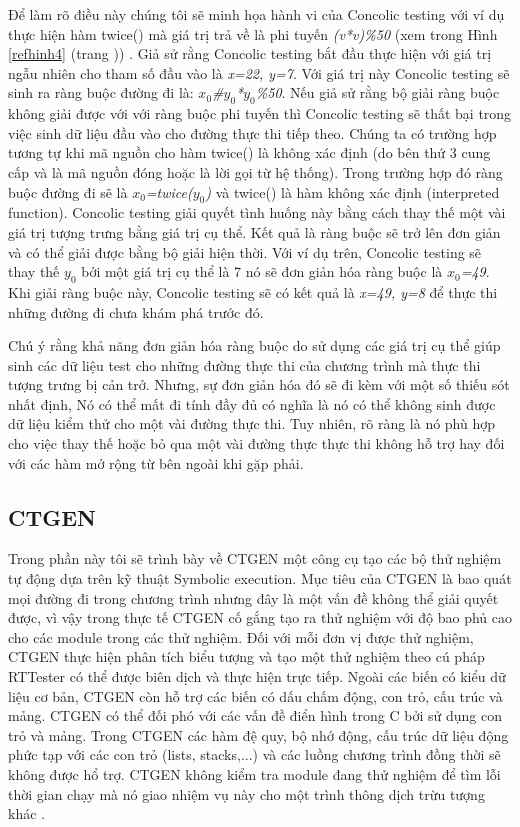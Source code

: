 \documentclass[12pt,a4paper]{article}
\begin{document}
\begin{enumerate}
Để làm rõ điều này chúng tôi sẽ minh họa hành vi của Concolic testing với ví dụ thực hiện hàm twice() mà giá trị trả về là phi tuyến \textit{(v*v)\%50} (xem trong Hình \ref{refhinh4} (trang \pageref{refhinh4})) . Giả sử rằng Concolic testing bắt đầu thực hiện với giá trị ngẫu nhiên cho tham số đầu vào là \textit{{x=22, y=7}}. Với giá trị này Concolic testing sẽ sinh ra ràng buộc đường đi là:  \textit{$x_0$\#$y_0$*$y_0$\%50}. Nếu giả sử rằng bộ giải ràng buộc không giải được với với ràng buộc phi tuyến thì Concolic testing sẽ thất bại trong việc sinh dữ liệu đầu vào cho đường thực thi tiếp theo. Chúng ta có trường hợp tương tự khi mã nguồn cho hàm twice() là không xác định (do bên thứ 3 cung cấp và là mã nguồn đóng hoặc là lời gọi từ hệ thống). Trong trường hợp đó ràng buộc đường đi sẽ là \textit{$x_0$=twice($y_0$)} và twice() là hàm không xác định (interpreted function). Concolic testing giải quyết tình huống này bằng cách thay thế một vài giá trị tượng trưng bằng giá trị cụ thể. Kết quả là ràng buộc sẽ trở lên đơn giản và có thể giải được bằng bộ giải hiện thời. Với ví dụ trên, Concolic testing sẽ thay thế \textit{$y_0$} bởi một giá trị cụ thể là 7 nó sẽ đơn giản hóa ràng buộc là \textit{$x_0$=49}. Khi giải ràng buộc này, Concolic testing sẽ có kết quả là \textit{{x=49, y=8}} để thực thi những đường đi chưa khám phá trước đó.

Chú ý rằng khả năng đơn giản hóa ràng buộc do sử dụng các giá trị cụ thể giúp sinh các dữ liệu test cho những đường thực thi của chương trình mà thực thi tượng trưng bị cản trở. Nhưng, sự đơn giản hóa đó sẽ đi kèm với một số thiếu sót nhất định, Nó có thể mất đi tính đầy đủ có nghĩa là nó có thể không sinh được dữ liệu kiểm thử cho một vài đường thực thi. Tuy nhiên, rõ ràng là nó phù hợp cho việc thay thế hoặc bỏ qua một vài đường thực thực thi không hỗ trợ hay đối với các hàm mở rộng từ bên ngoài khi gặp phải.

\end{enumerate}

\subsection{CTGEN}
Trong phần này tôi sẽ trình bày về CTGEN một công cụ tạo các bộ thử nghiệm tự động dựa trên kỹ thuật Symbolic execution. Mục tiêu của CTGEN là bao quát mọi đường đi trong chương trình nhưng đây là một vấn đề không thể giải quyết được, vì vậy trong thực tế CTGEN cố gắng tạo ra thử nghiệm với độ bao phủ cao cho các module trong các thử nghiệm. Đối với mỗi đơn vị được thử nghiệm, CTGEN thực hiện phân tích biểu tượng và tạo một thử nghiệm theo cú pháp RTTester \cite{mollerverified} có thể được biên dịch và thực hiện trực tiếp. Ngoài các biến có kiểu dữ liệu cơ bản, CTGEN còn hỗ trợ các biến có dấu chấm động, con trỏ, cấu trúc và mảng. CTGEN có thể đối phó với các vấn đề điển hình trong C bởi sử dụng con trỏ và mảng. Trong CTGEN các hàm đệ quy, bộ nhớ động, cấu trúc dữ liệu động phức tạp với các con trỏ (lists, stacks,...) và các luồng chương trình đồng thời sẽ không được hổ trợ. CTGEN không kiểm tra module đang thử nghiệm để tìm lỗi thời gian chạy mà nó giao nhiệm vụ này cho một trình thông dịch trừu tượng khác \cite{peleska2011automated}.
\end{document}
